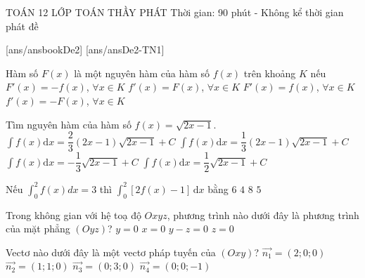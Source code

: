 ﻿\begin{name}
	{\tenchude}
	{TOÁN 12}
	{LỚP TOÁN THẦY PHÁT}
	{Thời gian: 90 phút - Không kể thời gian phát đề}
\end{name}
[ans/ansbookDe2]
\TN
{}[ans/ansDe2-TN1]
\begin{ex}%
Hàm số $F(x)$ là một nguyên hàm của hàm số $f(x)$ trên khoảng $K$ nếu
\choice
{$F'(x)=-f(x)$, $\forall x\in K$}
{$f'(x)=F(x)$, $\forall x\in K$}
{\True $F'(x)=f(x)$, $\forall x \in K$}
{$f'(x)=-F(x)$, $\forall x\in K$}
\end{ex}

\begin{ex}%
Tìm nguyên hàm của hàm số $f(x)=\sqrt {2x-1}$.
\choice
{ $\displaystyle\int{f(x)\mathrm{d}x=\dfrac{2}{3}( 2x-1 )\sqrt {2x-1}+C}$}
{\True $\displaystyle\int{f(x)\mathrm{d}x=\dfrac{1}{3}( 2x-1 )\sqrt {2x-1}+C}$}
{ $\displaystyle\int{f(x)\mathrm{d}x=-\dfrac{1}{3}\sqrt {2x-1}+C}$}
{$\displaystyle\int{f(x)\mathrm{d}x=\dfrac{1}{2}\sqrt {2x-1}+C}$}
\end{ex}

\begin{ex}%
Nếu $\displaystyle\int_0^2 f(x) d x=3$ thì $\displaystyle\int_0^2\left[2f(x)-1\right]\mathrm{\,d}x$ bằng
\choice
{$6$}
{\True $4$}
{$8$}
{$5$}
\end{ex}

\begin{ex}%
Trong không gian với hệ toạ độ $Oxyz$, phương trình nào dưới đây là phương trình của mặt phẳng $(Oyz)$?
\choice
{$y=0$}
{\True $x=0$}
{$y-z=0$}
{$z=0$}
\end{ex}

\begin{ex}%
Vectơ nào dưới đây là một vectơ pháp tuyến của $(Oxy)$?
\choice
{$\vec{n_1}=(2;0;0)$}
{$\vec{n_2}=(1;1;0)$}
{$\vec{n_3}=(0;3;0)$}
{\True $\vec{n_4}=(0;0;-1)$}
\end{ex}

